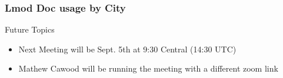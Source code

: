 \documentclass{beamer}
\begin{document}
\begin{frame}[fragile]
    \frametitle{Lmod Doc usage by City}
\end{frame}

\begin{frame}{Future Topics}
  \begin{itemize}
    \item Next Meeting will be Sept. 5th at 9:30 Central (14:30 UTC)
    \item Mathew Cawood will be running the meeting with a different
      zoom link
  \end{itemize}
\end{frame}
\end{document}
